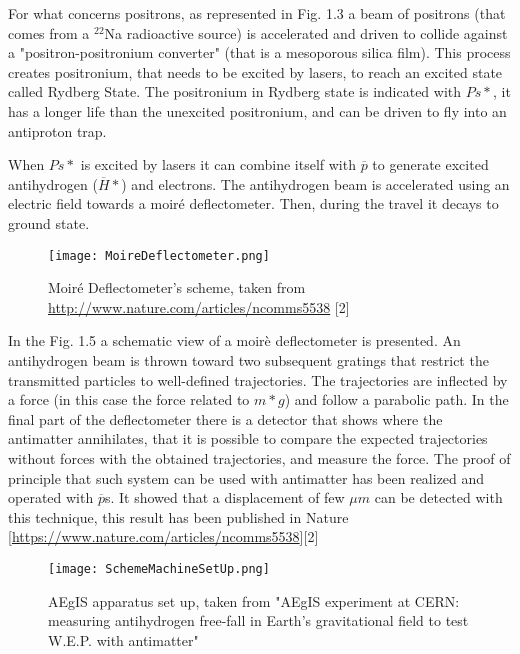 For what concerns positrons, as represented in Fig. 1.3 a beam of positrons (that comes from a $^{22}$Na radioactive source) is accelerated and driven to collide against a "positron-positronium converter" (that is a mesoporous silica film). This process creates positronium, that needs to be excited by lasers, to reach an excited state called Rydberg State. The positronium in Rydberg state is indicated with $ {Ps*} $, it has a longer life than the unexcited positronium, and can be driven to fly into an antiproton trap.


When $ {Ps*} $ is excited by lasers it can combine itself with $ \overline{p} $ to generate excited antihydrogen ($ \overline{H}* $) and electrons. The antihydrogen beam is accelerated using an electric field towards a moiré deflectometer. Then, during the travel it decays to ground state.  


\begin{figure}[H]
\centering
\texttt{[image: MoireDeflectometer.png]} 
\caption{Moiré Deflectometer's scheme, taken from \url{http://www.nature.com/articles/ncomms5538} [2]}
\end{figure}

In the Fig. 1.5 a schematic view of a moirè deflectometer is presented.
An antihydrogen beam is thrown toward two subsequent gratings that restrict the transmitted particles to well-defined trajectories. The trajectories are inflected by a force (in this case the force related to $ {m*g} $) and follow a parabolic path. In the final part of the deflectometer there is a detector that shows where the antimatter annihilates, that it is possible to compare the expected trajectories without forces with the obtained trajectories, and measure the force. The proof of principle that such system can be used with antimatter has been realized and operated with $ \overline{p} $s. It showed that a displacement of few $ \mu m $ can be detected with this technique, this result has been published in Nature [\url{https://www.nature.com/articles/ncomms5538}][2]


\begin{figure}[H]
\centering
\texttt{[image: SchemeMachineSetUp.png]} 
\caption{AEgIS apparatus set up, taken from "AEgIS experiment at CERN: measuring antihydrogen free-fall in Earth’s gravitational field to test W.E.P. with antimatter" }
\end{figure}
